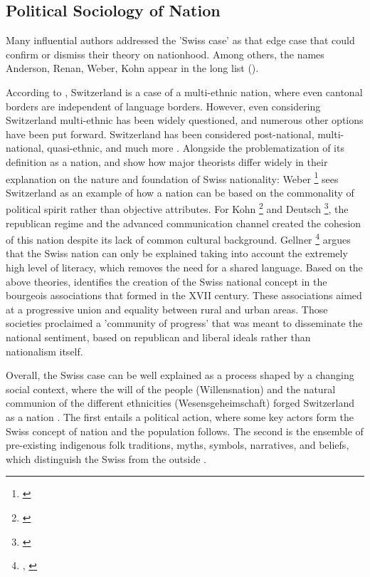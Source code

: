 \documentclass[11pt]{article}
\begin{document}
\subsection{Political Sociology of Nation}
Many influential authors addressed the 'Swiss case' as that edge case that could confirm or dismiss their theory on nationhood. Among others, the names Anderson, Renan, Weber, Kohn appear in the long list (\cite{wimmer2011swiss}). 
\par

According to \cite{wimmer2011swiss}, Switzerland is a case of a multi-ethnic nation, where even cantonal borders are independent of language borders. However, even considering Switzerland multi-ethnic has been widely questioned, and numerous other options have been put forward. Switzerland has been considered post-national, multi-national, quasi-ethnic, and much more \citep{helbling2011switzerland}. Alongside the problematization of its definition as a nation, \cite{wimmer2011swiss} and \cite{helbling2011switzerland} show how major theorists differ widely in their explanation on the nature and foundation of Swiss nationality: Weber \footnote{\citep{weber1978economy}} sees Switzerland as an example of how a nation can be based on the commonality of political spirit rather than objective attributes. For Kohn \footnote{\citep{kohn1956nationalism}} and Deutsch \footnote{\citep{deutsch1953nationalism}}, the republican regime and the advanced communication channel created the cohesion of this nation despite its lack of common cultural background. Gellner \footnote{\citep{gellner1991nationalisme}, \citep{gellner2008nations}} argues that the Swiss nation can only be explained taking into account the extremely high level of literacy, which removes the need for a shared language. 
Based on the above theories, \cite{wimmer2011swiss} identifies the creation of the Swiss national concept in the bourgeois associations that formed in the XVII century. These associations aimed at a progressive union and equality between rural and urban areas. Those societies proclaimed a 'community of progress' that was meant to disseminate the national sentiment, based on republican and liberal ideals rather than nationalism itself.

Overall, the Swiss case can be well explained as a process shaped by a changing social context, where the will of the people (Willensnation) and the natural communion of the different ethnicities (Wesensgeheimschaft) forged Switzerland as a nation \citep{zimmer1999forging}. The first entails a political action, where some key actors form the Swiss concept of nation and the population follows. The second is the ensemble of pre-existing indigenous folk traditions, myths, symbols, narratives, and
beliefs, which distinguish the Swiss from the outside \citep{zimmer1999forging}. \par
\end{document}
